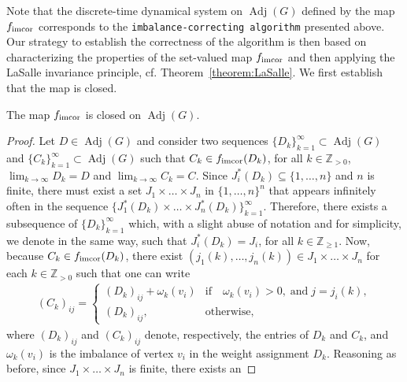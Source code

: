 \documentclass[final]{siamltex}
\begin{document}
Note that the discrete-time dynamical system on ${\operatorname{Adj}}(G)$ defined by
the map $ {{f}_{\textup{{imcor}}}}$ corresponds to the {\texttt{imbalance-correcting algorithm}\xspace} presented
above. Our strategy to establish the correctness of the algorithm is
then based on characterizing the properties of the set-valued map $
{{f}_{\textup{{imcor}}}}$ and then applying the LaSalle invariance principle,
cf. Theorem~\ref{theorem:LaSalle}. We first establish that the map is
closed.

\begin{lemma}\label{lemma:f_closed}
  The map $ {{f}_{\textup{{imcor}}}} $ is closed on $ {\operatorname{Adj}}(G) $.
\end{lemma}

\begin{proof}
  Let $ D \in {\operatorname{Adj}}(G) $ and consider two sequences
  $\{D_k\}_{k=1}^{\infty} \subset {\operatorname{Adj}}(G)$ and $\{C_k\}_{k=1}^{\infty}
  \subset {\operatorname{Adj}}(G) $ such that $ C_k\in {{f}_{\textup{{imcor}}}}(D_k) $, for
  all $ k \in \mathbb{Z}_{>0}$, $ \lim_{k\rightarrow \infty}D_k=D $
  and $ \lim_{k\rightarrow \infty}C_k=C $.  Since $ J_i^*(D_k)
  \subseteq \{1,\ldots, n\} $ and $n$ is finite, there must exist a
  set $J_1 \times \dots \times J_n$ in ${\{1,\ldots, {n}\}}^n$ that appears
  infinitely often in the sequence $\{ J_1^*(D_k) \times \dots \times
  J_n^*(D_k) \}_{k=1}^{\infty}$. Therefore, there exists a subsequence
  of $\{D_k\}_{k=1}^{\infty}$ which, with a slight abuse of notation
  and for simplicity, we denote in the same way, such that $
  J_i^*(D_k)=J_i $, for all $ k \in \mathbb{Z}_{\geq 1} $.  Now,
  because $ C_k\in {{f}_{\textup{{imcor}}}}(D_k) $, there exist
  $(j_1(k),\ldots, j_n(k)) \in J_1\times \ldots \times J_n$ for each $k \in
  \mathbb{Z}_{>0}$ such that one can write
  \begin{align}\label{eq:aux}
    (C_k)_{ij}=
    \begin{cases}
      (D_k)_{ij}+\omega_k(v_i)& \mathrm{if} \quad \omega_k(v_i)>0, \;
      \mathrm{and} \; j=j_i(k) ,
      \\
      (D_k)_{ij}, & \mathrm{otherwise} ,
    \end{cases}
  \end{align}
  where $ (D_k)_{ij} $ and $ (C_k)_{ij} $ denote, respectively, the
  entries of $ D_k $ and $ C_k $, and $\omega_k(v_i)$ is the imbalance
  of vertex $v_i$ in the weight assignment $D_k$. Reasoning as before,
  since $ J_1\times \ldots \times J_n $ is finite, there exists an

\end{proof}
\end{document}
